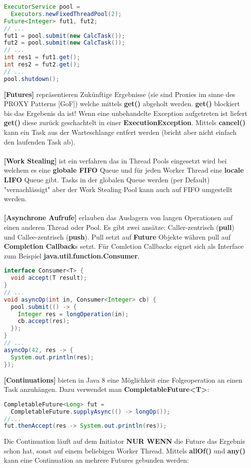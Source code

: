 \documentclass[8pt]{extarticle}
\let\oldtextbf\textbf
\renewcommand{\textbf}{\tiny\oldtextbf}
\begin{document}
\begin{multicols*}{5}
\begin{lstlisting}[language=java]
ExecutorService pool =
  Executors.newFixedThreadPool(2);
Future<Integer> fut1, fut2;
// ...
fut1 = pool.submit(new CalcTask());
fut2 = pool.submit(new CalcTask());
// ...
int res1 = fut1.get();
int res2 = fut2.get();
// ...
pool.shutdown();
\end{lstlisting}
\textbf{[Futures]} repräsentieren Zukünftige Ergebnisse (sie sind Proxies im sinne des PROXY Patterns [GoF]) welche mittels \textbf{get()} abgeholt werden. \textbf{get()} blockiert bis das Ergebenis da ist! Wenn eine unbehandelte Exception aufgetreten ist liefert \textbf{get()} diese zurück geschachtelt in einer \textbf{ExecutionException}. Mittels \textbf{cancel()} kann ein Task aus der Warteschlange entfert werden (bricht aber nicht einfach den laufenden Task ab).\\\\
\textbf{[Work Stealing]} ist ein verfahren das in Thread Pools eingesetzt wird bei welchem es eine \textbf{globale FIFO} Queue und für jeden Worker Thread eine \textbf{locale LIFO} Queue gibt. Tasks in der globalen Queue werden (per Default) "vernachlässigt" aber der Work Stealing Pool kann auch auf FIFO umgestellt werden.\\\\
\textbf{[Asynchrone Aufrufe]} erlauben das Auslagern von langen Operationen auf einen anderen Thread oder Pool. Es gibt zwei ansätze: Caller-zentrisch (\textbf{pull}) und Callee-zentrisch (\textbf{push}). Pull setzt auf \textbf{Future} Objekte währen pull auf \textbf{Completion Callback}s setzt. Für Comletion Callbacks eignet sich als Interface zum Beispiel \textbf{java.util.function.Consumer}.
\begin{lstlisting}[language=java]
interface Consumer<T> {
  void accept(T result);
}
// ...
void asyncOp(int in, Consumer<Integer> cb) {
  pool.submit(() -> {
    Integer res = longOperation(in);
    cb.accept(res);
  });
}
// ...
asyncOp(42, res -> {
  System.out.println(res);
});
\end{lstlisting}
\textbf{[Continuations]} bieten in Java 8 eine Möglichkeit eine Folgeoperation an einen Task anzuhängen. Dazu verwendet man \textbf{CompletableFuture<T>}:
\begin{lstlisting}[language=java]
CompletableFuture<Long> fut = 
  CompletableFuture.supplyAsync(() -> longOp());
//...
fut.thenAccept(res -> System.out.println(res));
\end{lstlisting}
Die Continuation läuft auf dem Initiator \textbf{NUR WENN} die Future das Ergebnis schon hat, sonst auf einem beliebigen Worker Thread. Mittels \textbf{allOf()} und \textbf{any()} kann eine Continuation an mehrere Futures gebunden werden:

\end{multicols*}
\end{document}
